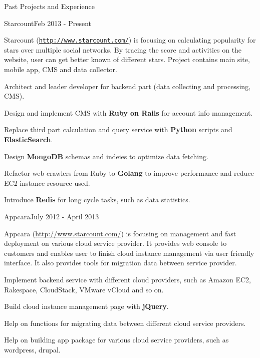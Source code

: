 \documentclass{resume} %
\newcommand{\http}{http:/\hspace{-0.3ex}/}
\begin{document}
\begin{rSection}{Past Projects and Experience}



\begin{rSubsection}{Starcount}{Feb 2013 - Present}{}{}

Starcount (\href{http://www.starcount.com/}{\tt \http{}www.starcount.com/}) is focusing on calculating popularity for stars over multiple social networks. By tracing the score and activities on the website, user can get better known of different stars. Project contains main site, mobile app, CMS and data collector.

\begin{rSubsectionList}
\item Architect and leader developer for backend part (data collecting and processing, CMS).
\item Design and implement CMS with \textbf{Ruby on Rails} for account info management.
\item Replace third part calculation and query service with \textbf{Python} scripts and \textbf{ElasticSearch}.
\item Design \textbf{MongoDB} schemas and indeies to optimize data fetching.
\item Refactor web crawlers from Ruby to \textbf{Golang} to improve performance and reduce EC2 instance resource used.
\item Introduce \textbf{Redis} for long cycle tasks, such as data statistics.
\end{rSubsectionList}
\end{rSubsection}



\begin{rSubsection}{Appcara}{July 2012 - April 2013}{}{}

Appcara (\href{http://www.starcount.com/}{\http{}www.starcount.com/}) is focusing on management and fast deployment on various cloud service provider. It provides web console to customers and enables user to finish cloud instance management via user friendly interface. It also provides tools for migration data between service provider. 

\begin{rSubsectionList}
\item Implement backend service with different cloud providers, such as Amazon EC2, Rakespace, CloudStack, VMware vCloud and so on.
\item Build cloud instance management page with \textbf{jQuery}.
\item Help on functions for migrating data between different cloud service providers.
\item Help on building app package for various cloud service providers, such as wordpress, drupal.
\end{rSubsectionList}
\end{rSubsection}




\end{rSection}
\end{document}
